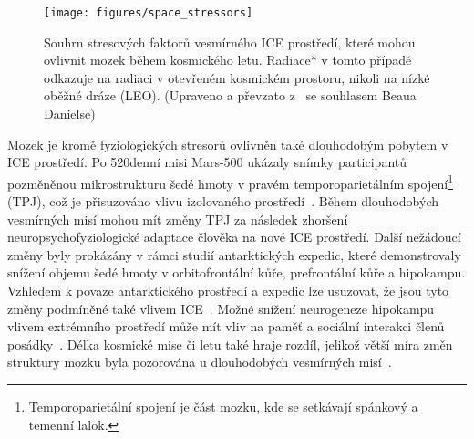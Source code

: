 \begin{figure}[!htb]
    \begin{center}
        \texttt{[image: figures/space\_stressors]}
        \caption{Souhrn stresových faktorů vesmírného \gls{ICE} prostředí, které
            mohou ovlivnit mozek během kosmického letu. Radiace* v tomto případě
            odkazuje na radiaci v otevřeném kosmickém prostoru, nikoli na nízké
            oběžné dráze (\gls{LEO}). (Upraveno a převzato
            z~\cite{Roy2021,Hodkinson2017} se souhlasem Beaua Danielse)}
        \label{fig:factors_neuro}
    \end{center}
\end{figure}

Mozek je kromě fyziologických stresorů ovlivněn také dlouhodobým pobytem v
\gls{ICE} prostředí. Po 520denní misi Mars-500 ukázaly snímky participantů
pozměněnou mikrostrukturu šedé hmoty v pravém temporoparietálním
spojení\footnote{Temporoparietální spojení je část mozku, kde se setkávají
spánkový a temenní lalok.} (\gls{TPJ}), což je přisuzováno vlivu izolovaného
prostředí~\cite{Brem2020}. Během dlouhodobých vesmírných misí mohou mít změny
TPJ za následek zhoršení neuropsychofyziologické adaptace člověka na nové ICE
prostředí. Další nežádoucí změny byly prokázány v rámci studií antarktických
expedic, které demonstrovaly snížení objemu šedé hmoty v orbitofrontální kůře,
prefrontální kůře a hipokampu. Vzhledem k povaze antarktického prostředí a
expedic lze usuzovat, že jsou tyto změny podmíněné také vlivem
\gls{ICE}~\cite{Stahn2019}. Možné snížení neurogeneze hipokampu vlivem
extrémního prostředí může mít vliv na paměť a sociální interakci členů
posádky~\cite{Roy2021}. Délka kosmické mise či letu také hraje rozdíl, jelikož
větší míra změn struktury mozku byla pozorována u dlouhodobých vesmírných
misí~\cite{Roberts2017}.